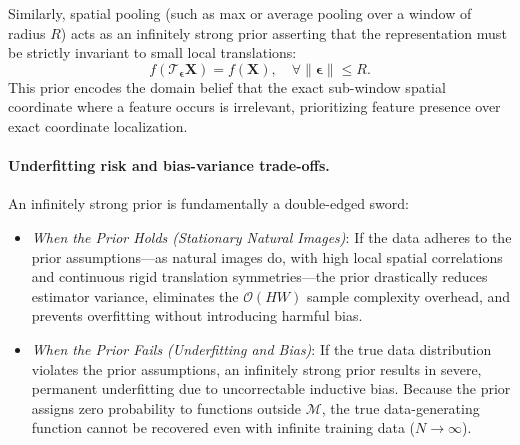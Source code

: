 Similarly, spatial pooling (such as max or average pooling over a window of radius $R$) acts as an infinitely strong prior asserting that the representation must be strictly invariant to small local translations:
\begin{equation}
f\left( \mathcal{T}_{\boldsymbol{\epsilon}} \mathbf{X} \right) = f(\mathbf{X}), \quad \forall \|\boldsymbol{\epsilon}\| \le R.
\label{eq:prior_pooling_invariance}
\end{equation}
This prior encodes the domain belief that the exact sub-window spatial coordinate where a feature occurs is irrelevant, prioritizing feature presence over exact coordinate localization.

\paragraph{Underfitting risk and bias-variance trade-offs.}
An infinitely strong prior is fundamentally a double-edged sword:
\begin{itemize}[leftmargin=*]
  \item \textit{When the Prior Holds (Stationary Natural Images)}:
    If the data adheres to the prior assumptions—as natural images do, with high local spatial correlations and continuous rigid translation symmetries—the prior drastically reduces estimator variance, eliminates the $\mathcal{O}(HW)$ sample complexity overhead, and prevents overfitting without introducing harmful bias.
  
  \item \textit{When the Prior Fails (Underfitting and Bias)}:
    If the true data distribution violates the prior assumptions, an infinitely strong prior results in severe, permanent underfitting due to uncorrectable inductive bias. Because the prior assigns zero probability to functions outside $\mathcal{M}$, the true data-generating function cannot be recovered even with infinite training data ($N \to \infty$).
\end{itemize}


